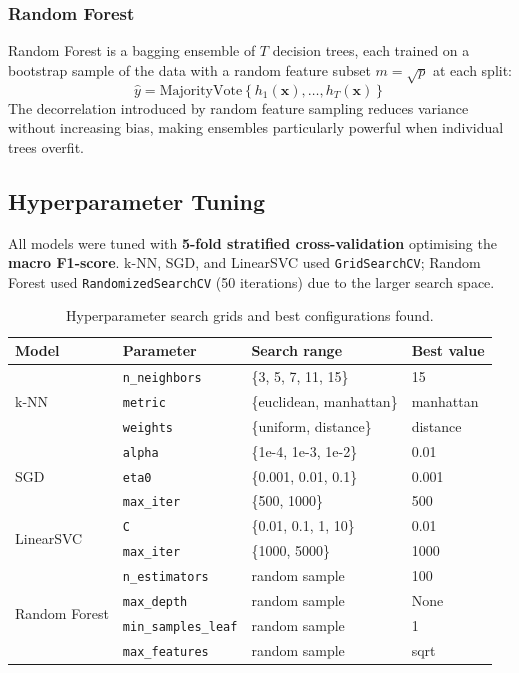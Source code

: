 \documentclass[12pt,a4paper]{article}
\begin{document}
\subsubsection{Random Forest}

Random Forest is a bagging ensemble of $T$ decision trees, each trained on a
bootstrap sample of the data with a random feature subset $m = \sqrt{p}$ at
each split:
\[
  \hat{y} = \text{MajorityVote}\!\left\{h_1(\mathbf{x}),\dots,h_T(\mathbf{x})\right\}
\]
The decorrelation introduced by random feature sampling reduces variance
without increasing bias, making ensembles particularly powerful when
individual trees overfit.

\subsection{Hyperparameter Tuning}

All models were tuned with \textbf{5-fold stratified cross-validation}
optimising the \textbf{macro F1-score}. k-NN, SGD, and LinearSVC used
\texttt{GridSearchCV}; Random Forest used \texttt{RandomizedSearchCV}
(50 iterations) due to the larger search space.

\begin{table}[H]
\centering
\caption{Hyperparameter search grids and best configurations found.}
\label{tab:hyperparam}
\renewcommand{\arraystretch}{1.25}
\begin{tabular}{llll}
\toprule
\textbf{Model} & \textbf{Parameter} & \textbf{Search range} & \textbf{Best value} \\
\midrule
\multirow{3}{*}{k-NN}
  & \texttt{n\_neighbors} & \{3, 5, 7, 11, 15\}    & 15 \\
  & \texttt{metric}       & \{euclidean, manhattan\}& manhattan \\
  & \texttt{weights}      & \{uniform, distance\}   & distance \\
\midrule
\multirow{3}{*}{SGD}
  & \texttt{alpha}   & \{1e-4, 1e-3, 1e-2\}      & 0.01 \\
  & \texttt{eta0}    & \{0.001, 0.01, 0.1\}       & 0.001 \\
  & \texttt{max\_iter} & \{500, 1000\}             & 500 \\
\midrule
\multirow{2}{*}{LinearSVC}
  & \texttt{C}        & \{0.01, 0.1, 1, 10\}      & 0.01 \\
  & \texttt{max\_iter}& \{1000, 5000\}             & 1000 \\
\midrule
\multirow{4}{*}{Random Forest}
  & \texttt{n\_estimators}   & random sample          & 100 \\
  & \texttt{max\_depth}      & random sample          & None \\
  & \texttt{min\_samples\_leaf} & random sample       & 1 \\
  & \texttt{max\_features}   & random sample          & sqrt \\
\bottomrule
\end{tabular}
\end{table}
\end{document}
